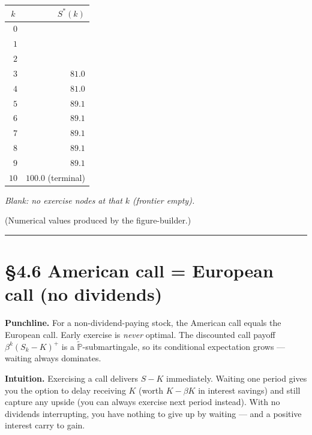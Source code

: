 \documentclass[
  10pt,
  twoside]{book}
\newcounter{none} %
\begin{document}
{\def\LTcaptype{none} %
\begin{table}[H]
\centering
\begin{tabular}{|c|r|}
\toprule
\(k\) & \(S^*(k)\) \\
\midrule



\(\phantom{0}0\) & \\
\(\phantom{0}1\) & \\
\(\phantom{0}2\) & \\
\(\phantom{0}3\) & \(\phantom{0}81.0\) \\
\(\phantom{0}4\) & \(\phantom{0}81.0\) \\
\(\phantom{0}5\) & \(\phantom{0}89.1\) \\
\(\phantom{0}6\) & \(\phantom{0}89.1\) \\
\(\phantom{0}7\) & \(\phantom{0}89.1\) \\
\(\phantom{0}8\) & \(\phantom{0}89.1\) \\
\(\phantom{0}9\) & \(\phantom{0}89.1\) \\
\(10\) & \(100.0\) (terminal) \\
\bottomrule
\end{tabular}
\end{table}
}

\emph{Blank: no exercise nodes at that \(k\) (frontier empty).}

(Numerical values produced by the figure-builder.)

\begin{center}\rule{0.5\linewidth}{0.5pt}\end{center}

\section{§4.6 American call = European call (no
dividends)}\label{american-call-european-call-no-dividends}

\textbf{Punchline.} For a non-dividend-paying stock, the American call
equals the European call. Early exercise is \emph{never} optimal. The
discounted call payoff \(\beta^k(S_k - K)^+\) is a
\(\tilde{\mathbb{P}}\)-submartingale, so its conditional expectation
grows --- waiting always dominates.

\textbf{Intuition.} Exercising a call delivers \(S - K\) immediately.
Waiting one period gives you the option to delay receiving \(K\) (worth
\(K - \beta K\) in interest savings) and still capture any upside (you
can always exercise next period instead). With no dividends
interrupting, you have nothing to give up by waiting --- and a positive
interest carry to gain.
\end{document}
